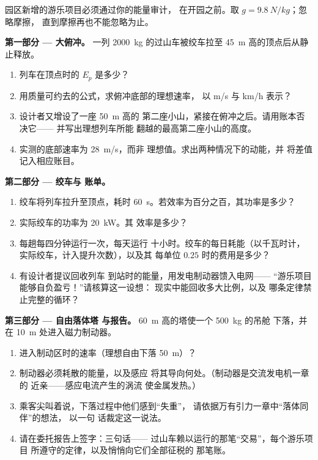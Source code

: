 \begin{problem}\label{pb:g9:energy-conversions:1}
园区新增的游乐项目必须通过你的能量审计，
在开园之前。取 $g = \qty{9.8}{N/kg}$；忽略摩擦，
直到摩擦再也不能忽略为止。

\medskip\noindent\textbf{第一部分 --- 大俯冲。}
一列 \qty{2000}{kg} 的过山车被绞车拉至
\qty{45}{m} 高的顶点后从静止释放。
\begin{enumerate}
  \item 列车在顶点时的 $E_p$ 是多少？
  \item 用质量可约去的公式，求俯冲底部的理想速率，
        以 \unit{m/s} 与
        \unit{km/h} 表示？
  \item 设计者又增设了一座 \qty{50}{m} 高的
        第二座小山，紧接在俯冲之后。请用账本否决它——
        并写出理想列车所能
        翻越的最高第二座小山的高度。
  \item 实测的底部速率为 \qty{28}{m/s}，而非
        理想值。求出两种情况下的动能，并
        将差值记入相应账目。
\end{enumerate}

\medskip\noindent\textbf{第二部分 --- 绞车与
账单。}
\begin{enumerate}[resume]
  \item 绞车将列车拉升至顶点，耗时
        \qty{60}{s}。若效率为百分之百，其功率是多少？
  \item 实际绞车的功率为 \qty{20}{kW}。其
        效率是多少？
  \item 每趟每四分钟运行一次，每天运行
        十小时。绞车的每日耗能（以千瓦时计，
        实际绞车，计入提升次数），以及其
        每单位 $0.25$ 时的费用是多少？
  \item 有设计者提议回收列车
        到站时的能量，用发电制动器馈入电网——
        “游乐项目能够自负盈亏！”请核算这一设想：
        现实中能回收多大比例，以及
        哪条定律禁止完整的循环？
\end{enumerate}

\medskip\noindent\textbf{第三部分 --- 自由落体塔
与报告。}
\qty{60}{m} 高的塔使一个 \qty{500}{kg} 的吊舱
下落，并在 \qty{10}{m} 处进入磁力制动器。
\begin{enumerate}[resume]
  \item 进入制动区时的速率（理想自由下落
        \qty{50}{m}）？
  \item 制动器必须耗散的能量，以及感应
        将其导向何处。（制动器是交流发电机一章的
        近亲——感应电流产生的涡流
        使金属发热。）
  \item 乘客尖叫着说，下落过程中他们感到“失重”，
        请依据万有引力一章中“落体同伴”的想法，
        以一句
        话裁定这一说法。
  \item 请在委托报告上签字：三句话——
        过山车赖以运行的那笔“交易”，每个游乐项目
        所遵守的定律，以及悄悄向它们全部征税的
        那笔账。
\end{enumerate}
\end{problem}
